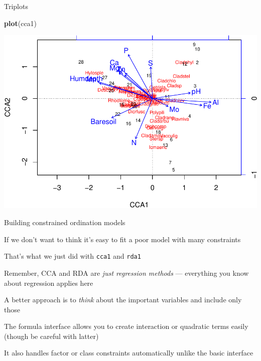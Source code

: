 \documentclass[10pt,ignorenonframetext,compress, aspectratio=169]{beamer}
\newenvironment{Shaded}{\begin{snugshade}}{\end{snugshade}}
\newcommand{\KeywordTok}[1]{\textcolor[rgb]{0.13,0.29,0.53}{\textbf{{#1}}}}
\newcommand{\NormalTok}[1]{{#1}}
\begin{document}
\begin{frame}[fragile]{Triplots}

\scriptsize

\begin{Shaded}
\begin{Highlighting}[]
\KeywordTok{plot}\NormalTok{(cca1)}
\end{Highlighting}
\end{Shaded}

\begin{center}\includegraphics[width=0.5\linewidth]{vegan-constrained-slides_files/figure-beamer/triplot-2-1} \end{center}

\normalsize

\end{frame}

\begin{frame}{Building constrained ordination models}

If we don't want to think it's easy to fit a poor model with many
constraints

That's what we just did with \texttt{cca1} and \texttt{rda1}

Remember, CCA and RDA are \emph{just regression methods} --- everything
you know about regression applies here

A better approach is to \emph{think} about the important variables and
include only those

The formula interface allows you to create interaction or quadratic
terms easily (though be careful with latter)

It also handles factor or class constraints automatically unlike the
basic interface

\end{frame}
\end{document}
